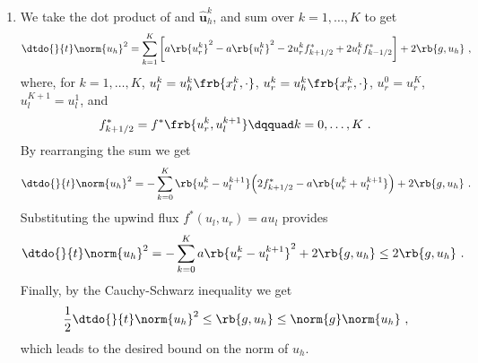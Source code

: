 \documentclass{article}
\def\hbu{\boldsymbol{\hat u}}
\begin{document}
\begin{exerciseList}
\begin{enumerate}
\item
We take the dot product of  and $\hbu_h^k$, and sum over $k=1,\ldots,K$ to get
\begin{gather}
	\dtdo{}{t}\norm{u_h}^2
		=\sum_{k=1}^K
			\bigg[
				a\rb{u_r^k}^2 -a\rb{u_l^k}^2 -2u_r^k f_{k+1/2}^* +2u_l^k f_{k-1/2}^*
			\bigg]
			+2\rb{g,u_h}\ ,
\end{gather}
where, for $k=1,\ldots,K$, $u_l^k=u_h^k\frb{x_l^k,\cdot}$, $u_r^k=u_h^k\frb{x_r^k,\cdot}$, $u_r^0=u_r^K$, $u_l^{K+1}=u_l^1$, and
\begin{gather}
	f^*_{k+1/2} =f^*\frb{u_r^k,u_l^{k+1}}
		\dqquad
		k=0,\ldots,K\ .
\end{gather}
By rearranging the sum we get
\begin{gather}
	\dtdo{}{t}\norm{u_h}^2
		=-\sum_{k=0}^K \rb{u_r^k-u_l^{k+1}}\Big( 2f^*_{k+1/2}-a\rb{u_r^k+u_l^{k+1}} \Big)
			+2\rb{g,u_h}\ .
\end{gather}
Substituting the upwind flux $f^*(u_l,u_r)=au_l$ provides
\begin{gather}
	\dtdo{}{t}\norm{u_h}^2
		=-\sum_{k=0}^K a\rb{u_r^k-u_l^{k+1}}^2
			+2\rb{g,u_h}
	 \le 2\rb{g,u_h}\ .
\end{gather}
Finally, by the Cauchy-Schwarz inequality we get
\begin{gather}
	\frac{1}{2}\dtdo{}{t}\norm{u_h}^2\le\rb{g,u_h}
		\le\norm{g}\norm{u_h}\ ,
\end{gather}
which leads to the desired bound on the norm of $u_h$.
\end{enumerate}



\item
\begin{enumerate}


\end{enumerate}
\end{exerciseList}
\end{document}
